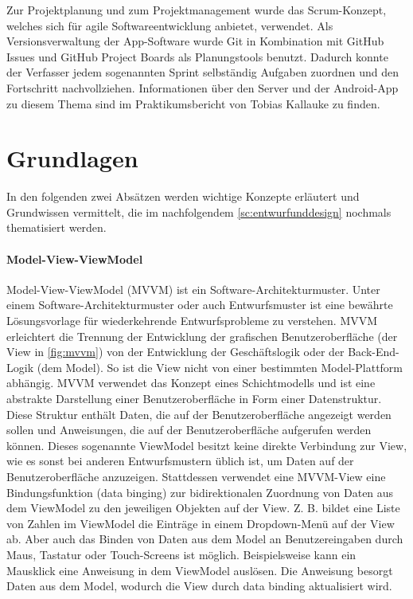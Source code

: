 \documentclass[notables, nomenclature, oneside, 150]{HSMW-Thesis}
\begin{document}
		Zur Projektplanung und zum Projektmanagement wurde das Scrum-Konzept, welches sich für agile Softwareentwicklung anbietet, verwendet. Als Versionsverwaltung der App-Software wurde Git in Kombination mit GitHub Issues und GitHub Project Boards als Planungstools benutzt. Dadurch konnte der Verfasser jedem sogenannten Sprint selbständig Aufgaben zuordnen und den Fortschritt nachvollziehen. Informationen über den Server und der Android-App zu diesem Thema sind im Praktikumsbericht von Tobias Kallauke zu finden.	

	\section{Grundlagen}
		In den folgenden zwei Absätzen werden wichtige Konzepte erläutert und Grundwissen vermittelt, die im nachfolgendem \autoref{sc:entwurfunddesign} nochmals thematisiert werden.

		\paragraph*{Model-View-ViewModel}
			Model-View-ViewModel (MVVM)  ist ein Software-Architekturmuster. Unter einem Software-Architekturmuster oder auch Entwurfsmuster ist eine bewährte Lösungsvorlage für wiederkehrende Entwurfsprobleme zu verstehen. MVVM erleichtert die Trennung der Entwicklung der grafischen Benutzeroberfläche (der View in \autoref{fig:mvvm}) von der Entwicklung der Geschäftslogik oder der Back-End-Logik (dem Model). So ist die View nicht von einer bestimmten Model-Plattform abhängig. MVVM verwendet das Konzept eines Schichtmodells und ist eine abstrakte Darstellung einer Benutzeroberfläche in Form einer Datenstruktur. Diese Struktur enthält Daten, die auf der Benutzeroberfläche angezeigt werden sollen und Anweisungen, die auf der Benutzeroberfläche aufgerufen werden können. Dieses sogenannte ViewModel besitzt keine direkte Verbindung zur View, wie es sonst bei anderen Entwurfsmustern üblich ist, um Daten auf der Benutzeroberfläche anzuzeigen. Stattdessen verwendet eine MVVM-View eine Bindungsfunktion (data binging) zur bidirektionalen Zuordnung von Daten aus dem ViewModel zu den jeweiligen Objekten auf der View. Z. B. bildet eine Liste von Zahlen im ViewModel die Einträge in einem Dropdown-Menü auf der View ab. Aber auch das Binden von Daten aus dem Model an Benutzereingaben durch Maus, Tastatur oder Touch-Screens ist möglich. Beispielsweise kann ein Mausklick eine Anweisung in dem ViewModel auslösen. Die Anweisung besorgt Daten aus dem Model, wodurch die View durch data binding aktualisiert wird. \cite{papa_fundamental_2011} \cite{freeman_pro_2017} \cite{bragge_model-view-controller_2013}	
			
\end{document}
